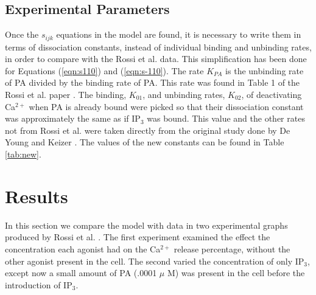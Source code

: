 \documentclass[preprint,12pt]{elsarticle}
\begin{document}
\subsection{Experimental Parameters}
Once the $s_{ijk}$ equations in the model are found, it is necessary to write them in terms of dissociation constants, instead of individual binding and unbinding rates, in order to compare with the Rossi et al. data. This simplification has been done for Equations (\ref{eqn:s110}) and (\ref{eqn:s-110}). The rate $K_{PA}$ is the unbinding rate of PA divided by the binding rate of PA. This rate was found in Table 1 of the Rossi et al. paper \cite{rossi}. The binding, $K_{01}$, and unbinding rates, $K_{02}$, of deactivating Ca$^{2+}$ when PA is already bound were picked so that their dissociation constant was approximately the same as if IP$_3$ was bound. This value and the other rates not from Rossi et al. were taken directly from the original study done by De Young and Keizer \cite{young}. The values of the new constants can be found in Table \ref{tab:new}.


\section{Results}
In this section we compare the model with data in two experimental graphs produced by Rossi et al. \cite{rossi}. The first experiment examined the effect the concentration each agonist had on the Ca$^{2+}$ release percentage, without the other agonist present in the cell. The second varied the concentration of only IP$_3$, except now a small amount of PA (.0001 $\mu$ M) was present in the cell before the introduction of IP$_3$.
\end{document}
